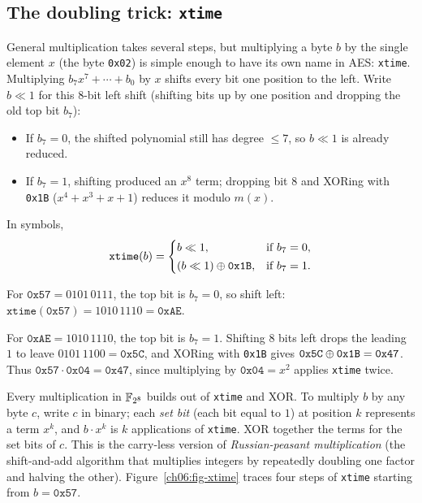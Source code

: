 \subsection{The doubling trick: \texttt{xtime}}

General multiplication takes several steps, but multiplying a byte $b$ by the
single element $x$ (the byte \texttt{0x02}) is simple enough to have its own
name in AES: \texttt{xtime}. Multiplying $b_7 x^7 + \cdots + b_0$ by $x$ shifts
every bit one position to the left. Write $b \ll 1$ for this $8$-bit left shift
(shifting bits up by one position and dropping the old top bit $b_7$):
\begin{itemize}
  \item If $b_7 = 0$, the shifted polynomial still has degree $\le 7$, so
        $b \ll 1$ is already reduced.
  \item If $b_7 = 1$, shifting produced an $x^8$ term; dropping bit $8$ and
        XORing with \texttt{0x1B} ($x^4+x^3+x+1$) reduces it modulo $m(x)$.
\end{itemize}
In symbols,
\[
\texttt{xtime}(b) =
\begin{cases}
b \ll 1, & \text{if } b_7 = 0,\\[2pt]
(b \ll 1) \oplus \texttt{0x1B}, & \text{if } b_7 = 1.
\end{cases}
\]

\begin{example}
\label{ch06:ex-xtime}
For $\texttt{0x57} = 0101\,0111$, the top bit is $b_7 = 0$, so shift left:
$\texttt{xtime}(\texttt{0x57}) = 1010\,1110 = \texttt{0xAE}$.

For $\texttt{0xAE} = 1010\,1110$, the top bit is $b_7 = 1$. Shifting $8$ bits
left drops the leading $1$ to leave $0101\,1100 = \texttt{0x5C}$, and XORing
with \texttt{0x1B} gives $\texttt{0x5C} \oplus \texttt{0x1B} = \texttt{0x47}$.
Thus $\texttt{0x57}\cdot \texttt{0x04} = \texttt{0x47}$, since multiplying by
$\texttt{0x04} = x^2$ applies \texttt{xtime} twice.
\end{example}

Every multiplication in $\mathbb{F}_{2^8}$ builds out of \texttt{xtime} and XOR. To
multiply $b$ by any byte $c$, write $c$ in binary; each \emph{set bit} (each
bit equal to $1$) at position $k$ represents a term $x^k$, and $b \cdot x^k$ is
$k$ applications of \texttt{xtime}. XOR together the terms for the set bits of
$c$. This is the carry-less version of \emph{Russian-peasant multiplication}
(the shift-and-add algorithm that multiplies integers by repeatedly doubling
one factor and halving the other). Figure~\ref{ch06:fig-xtime} traces four
steps of \texttt{xtime} starting from $b = \texttt{0x57}$.


